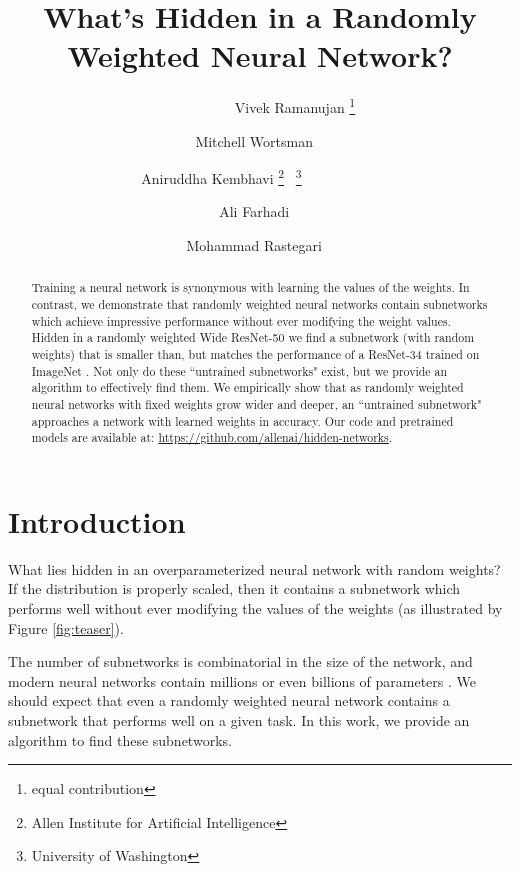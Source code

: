 \documentclass[10pt,twocolumn,letterpaper]{article}
\begin{document}
\title{What's Hidden in a Randomly Weighted Neural Network?}

\author{~~~~~~~~~~~ Vivek Ramanujan \thanks{equal contribution} \ \footnotemark[2]\and
Mitchell Wortsman \footnotemark[1] \ \footnotemark[3]\and
Aniruddha Kembhavi \thanks{Allen Institute for Artificial Intelligence} \ \thanks{University of Washington}~~~~~~~~~~~
\and
Ali Farhadi \ \footnotemark[3]
\and 
Mohammad Rastegari \ \footnotemark[3]
}


\maketitle



\begin{abstract}
Training a neural network is synonymous with learning the values of the weights. In contrast, we demonstrate that randomly weighted neural networks contain subnetworks which achieve impressive performance without ever modifying the weight values. Hidden in a randomly weighted Wide ResNet-50 \cite{wideresnet} we find a subnetwork (with random weights) that is smaller than, but matches the performance of a ResNet-34 \cite{resnet} trained on ImageNet \cite{imagenet}. Not only do these ``untrained subnetworks" exist, but we provide an algorithm to effectively find them. We empirically show that as randomly weighted neural networks with fixed weights grow wider and deeper, an ``untrained subnetwork" approaches a network with learned weights in accuracy. Our code and pretrained models are available at: \href{https://github.com/allenai/hidden-networks}{https://github.com/allenai/hidden-networks}.
\end{abstract}
\section{Introduction}
What lies hidden in an overparameterized neural network with random weights? If the distribution is properly scaled, then it contains a subnetwork which performs well without ever modifying the values of the weights (as illustrated by Figure \ref{fig:teaser}).

The number of subnetworks is combinatorial in the size of the network, and modern neural networks contain millions or even billions of parameters \cite{2019t5}. We should expect that even a randomly weighted neural network contains a subnetwork that performs well on a given task. In this work, we provide an algorithm to find these subnetworks.
\end{document}
